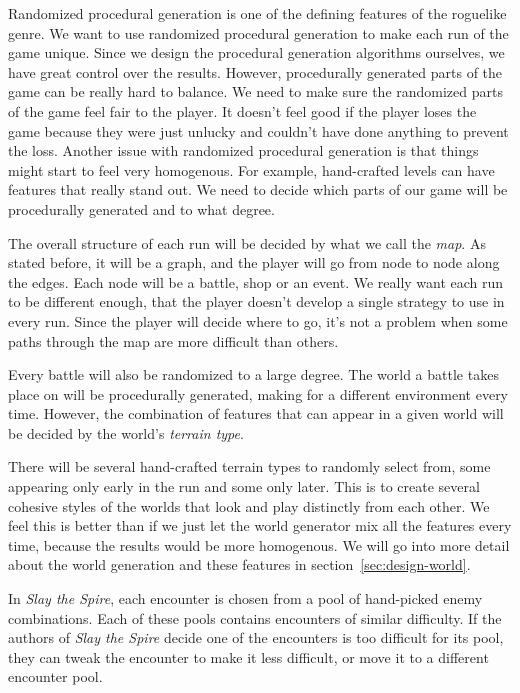 Randomized procedural generation is one of the defining features of the roguelike genre.
We want to use randomized procedural generation to make each run of the game unique.
Since we design the procedural generation algorithms ourselves, we have great control over the results.
However, procedurally generated parts of the game can be really hard to balance.
We need to make sure the randomized parts of the game feel fair to the player.
It doesn't feel good if the player loses the game because they were just unlucky and couldn't have done anything to prevent the loss.
Another issue with randomized procedural generation is that things might start to feel very homogenous.
For example, hand-crafted levels can have features that really stand out.
We need to decide which parts of our game will be procedurally generated and to what degree.

\begin{notindemo}
    The overall structure of each run will be decided by what we call the \emph{map}.
    As stated before, it will be a graph, and the player will go from node to node along the edges.
    Each node will be a battle, shop or an event.
    We really want each run to be different enough, that the player doesn't develop a single strategy to use in every run.
    Since the player will decide where to go, it's not a problem when some paths through the map are more difficult than others.
\end{notindemo}

Every battle will also be randomized to a large degree.
The world a battle takes place on will be procedurally generated, making for a different environment every time.
However, the combination of features that can appear in a given world will be decided by the world's \emph{terrain type}.
\begin{notindemo}
    There will be several hand-crafted terrain types to randomly select from, some appearing only early in the run and some only later.
    This is to create several cohesive styles of the worlds that look and play distinctly from each other.
    We feel this is better than if we just let the world generator mix all the features every time, because the results would be more homogenous.
    We will go into more detail about the world generation and these features in section~\ref{sec:design-world}.
\end{notindemo}

In \emph{Slay the Spire}, each encounter is chosen from a pool of hand-picked enemy combinations.
Each of these pools contains encounters of similar difficulty.
If the authors of \emph{Slay the Spire} decide one of the encounters is too difficult for its pool, they can tweak the encounter to make it less difficult, or move it to a different encounter pool.


